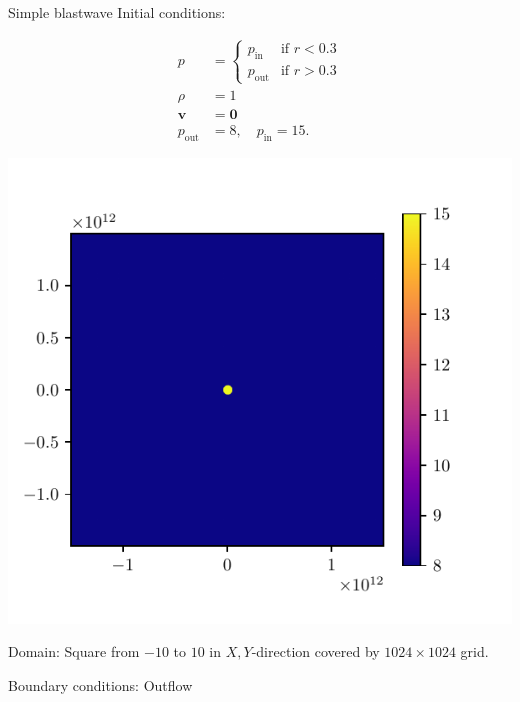 \documentclass{beamer}
\begin{document}
\begin{frame}{Simple blastwave}
Initial conditions:\\
\begin{minipage}{.49\linewidth}
\begin{align*}
	p &= \begin{cases}
		p_\text{in} & \text{if } r < 0.3\\
		p_\text{out} & \text{if } r > 0.3
	\end{cases} \\
	\rho &= 1 \\
	\mathbf v &=  \mathbf 0 \\
	p_\text{out}  &= 8, \quad p_\text{in}  = 15
.\end{align*}
\end{minipage}
\begin{minipage}{.49\linewidth}
	\includegraphics[width=\textwidth]{figures/initial.pdf}	
\end{minipage}
Domain: Square from $-10$ to $10$ in $ X, Y$-direction covered by $1024\times 1024$ grid.

Boundary conditions: Outflow


\end{frame}
\end{document}
